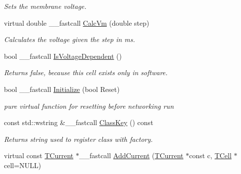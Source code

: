 \begin{DoxyCompactItemize}
\begin{DoxyCompactList}\small\item\em Sets the membrane voltage. \end{DoxyCompactList}\item 
\hypertarget{class_t_playback_cell_a32c5642349a72c44ff317fd172b9a121}{virtual double \+\_\+\+\_\+fastcall \hyperlink{class_t_playback_cell_a32c5642349a72c44ff317fd172b9a121}{Calc\+Vm} (double step)}\label{class_t_playback_cell_a32c5642349a72c44ff317fd172b9a121}

\begin{DoxyCompactList}\small\item\em Calculates the voltage given the step in ms. \end{DoxyCompactList}\item 
\hypertarget{class_t_playback_cell_a69ee14c129bcaf44ff40c14c2c66569b}{bool \+\_\+\+\_\+fastcall \hyperlink{class_t_playback_cell_a69ee14c129bcaf44ff40c14c2c66569b}{Is\+Voltage\+Dependent} ()}\label{class_t_playback_cell_a69ee14c129bcaf44ff40c14c2c66569b}

\begin{DoxyCompactList}\small\item\em Returns false, because this cell exists only in software. \end{DoxyCompactList}\item 
\hypertarget{class_t_playback_cell_a7dd6c3c0c873d74e767ce4881954f20b}{bool \+\_\+\+\_\+fastcall \hyperlink{class_t_playback_cell_a7dd6c3c0c873d74e767ce4881954f20b}{Initialize} (bool Reset)}\label{class_t_playback_cell_a7dd6c3c0c873d74e767ce4881954f20b}

\begin{DoxyCompactList}\small\item\em pure virtual function for resetting before networking run \end{DoxyCompactList}\item 
const std\+::wstring \&\+\_\+\+\_\+fastcall \hyperlink{class_t_playback_cell_a8e35ecdb1be99d97349d8904b6064e5d}{Class\+Key} () const 
\begin{DoxyCompactList}\small\item\em Returns string used to register class with factory. \end{DoxyCompactList}\item 
\hypertarget{class_t_playback_cell_aa6230016ea05dc27519729aa7bc38c0f}{virtual const \hyperlink{class_t_current}{T\+Current} $\ast$\+\_\+\+\_\+fastcall \hyperlink{class_t_playback_cell_aa6230016ea05dc27519729aa7bc38c0f}{Add\+Current} (\hyperlink{class_t_current}{T\+Current} $\ast$const c, \hyperlink{class_t_cell}{T\+Cell} $\ast$cell=N\+U\+L\+L)}\label{class_t_playback_cell_aa6230016ea05dc27519729aa7bc38c0f}


\end{DoxyCompactItemize}
